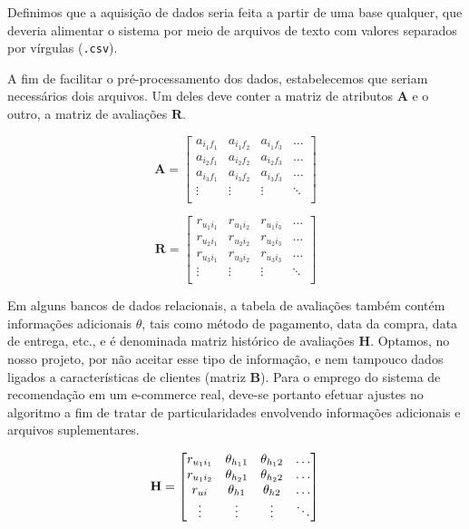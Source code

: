 Definimos que a aquisição de dados seria feita a partir de uma base qualquer, que deveria alimentar o sistema por meio de arquivos de texto com valores separados por vírgulas (\texttt{.csv}).

A fim de facilitar o pré-processamento dos dados, estabelecemos que seriam necessários dois arquivos. Um deles deve conter a matriz de atributos $\mathbf{A}$ e o outro, a matriz de avaliações  $\mathbf{R}$. 

\begin{equation} 
\mathbf{A} = 
\begin{bmatrix} 
 a_{i_1 f_1} &  a_{i_1 f_2} &  a_{i_1 f_3}  & \dots   \\
 a_{i_2 f_1} &  a_{i_2 f_2} &  a_{i_2 f_3}  & \dots   \\
 a_{i_3 f_1} &  a_{i_3 f_2} &  a_{i_3 f_3}  & \dots  \\ 
 \vdots &  \vdots &  \vdots  & \ddots   \\
 \end{bmatrix}
\end{equation}


\begin{equation}
	  \mathbf{R} = 
\begin{bmatrix} 
  r_{u_1 i_1} &  r_{u_1 i_2} &  r_{u_1 i_3}  & \dots   \\
 r_{u_2 i_1} &  r_{u_2 i_2} &  r_{u_2 i_3}  & \dots   \\
 r_{u_3 i_1} &  r_{u_3 i_2} &  r_{u_3 i_3}  & \dots  \\ 
 \vdots &  \vdots &  \vdots  & \ddots   \\
\end{bmatrix}
\end{equation}

Em alguns bancos de dados relacionais, a tabela de avaliações também contém informações adicionais $\theta$, tais como método de pagamento, data da compra, data de entrega, etc., e é denominada matriz histórico de avaliações $\mathbf{H}$. Optamos, no nosso projeto, por não aceitar esse tipo de informação, e nem tampouco dados ligados a características de clientes (matriz $\mathbf{B}$). Para o emprego do sistema de recomendação em um e-commerce real, deve-se portanto efetuar ajustes no algoritmo a fim de tratar de particularidades envolvendo informações adicionais e arquivos suplementares.

\begin{equation} 
\mathbf{H} =
\begin{bmatrix} 
 r_{u_1 i_1} &  \theta_{h_1 1} &  \theta_{h_1 2} & \dots   \\
 r_{u_1 i_2} &  \theta_{h_2 1} &  \theta_{h_2 2} & \dots   \\
 r_{u i} &  \theta_{h 1} &  \theta_{h 2} & \dots   \\
 \vdots &  \vdots &  \vdots  & \ddots   \\
 \end{bmatrix} \\
\end{equation}

